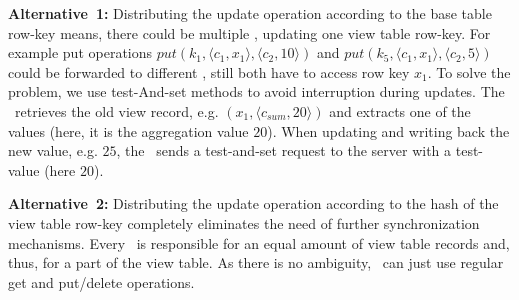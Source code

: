 \noindent
\textbf{Alternative~1:} Distributing the update operation according to the
base table row-key means, there could be multiple \VM, updating one view
table row-key. For example put operations $put(k_1, \langle c_1, x_1\rangle, 
\langle c_2, 10\rangle)$ and $put(k_5, \langle c_1, x_1\rangle, \langle c_2, 
5\rangle)$ could be forwarded to different \VMs, still both \VMs have to
access row key $x_1$. To solve the problem, we use test-And-set methods to 
avoid interruption during updates. The \VM\ retrieves the old view record,
e.g. $(x_1, \langle c_{sum},20\rangle)$ and extracts one of the values (here,
it is the aggregation value $20$). When updating and writing back the new 
value, e.g. $25$, the \VM\ sends a test-and-set request to the server with
a test-value (here $20$). 


\noindent
\textbf{Alternative~2:} Distributing the update operation according to the 
hash of the view table row-key completely eliminates the need of further 
synchronization mechanisms. Every \VM\ is responsible for an equal amount
of view table records and, thus, for a part of the view table. As there is 
no ambiguity, \VMs\ can just use regular get and put/delete operations.


%



